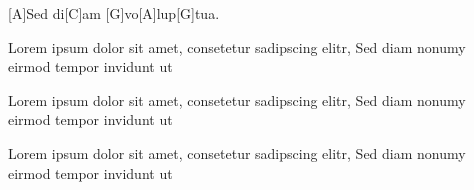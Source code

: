 \begin{guitar}
	\begin{highlightbar}
		 
		[A]Sed di[C]am [G]vo[A]lup[G]tua.
	\end{highlightbar}
	
	\pagebreak
{}
	 
	Lorem ipsum dolor sit amet, consetetur sadipscing elitr, 
	Sed diam nonumy eirmod tempor invidunt ut
	
	 
	Lorem ipsum dolor sit amet, consetetur sadipscing elitr, 
	Sed diam nonumy eirmod tempor invidunt ut
	
	 
	Lorem ipsum dolor sit amet, consetetur sadipscing elitr, 
	Sed diam nonumy eirmod tempor invidunt ut
	
	
\end{guitar}